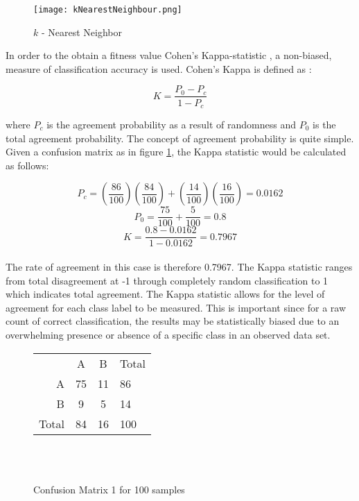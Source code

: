 \documentclass[journal,comsoc]{IEEEtran}
\begin{document}
\begin{figure}[H]
\centering
\texttt{[image: kNearestNeighbour.png]}
\caption{$k$ - Nearest Neighbor}
\end{figure}

In order to the obtain a fitness value Cohen's Kappa-statistic , a non-biased, measure of classification accuracy is used. Cohen's Kappa is defined as \cite{ben2008comparison}:

\begin{equation}
	K = \frac{P_0 - P_c}{1 - P_c}
\end{equation}

where $P_c$ is the agreement probability as a result of randomness and $P_0$ is the total agreement probability. The concept of agreement probability is quite simple. Given a confusion matrix as in figure \ref{fig:confuse}, the Kappa statistic would be calculated as follows:


$$
P_c = (\frac{86}{100})(\frac{84}{100}) + (\frac{14}{100})(\frac{16}{100}) = 0.0162
$$
$$
P_0 = \frac{75}{100} + \frac{5}{100} = 0.8
$$
\begin{equation}
K = \frac{0.8 - 0.0162}{1 - 0.0162} = 0.7967
\end{equation}
\hfill\\

The rate of agreement in this case is therefore 0.7967. The Kappa statistic ranges from total disagreement at -1 through completely random classification to 1 which indicates total agreement. The Kappa statistic allows for the level of agreement for each class label to be measured. This is important since for a raw count of correct classification, the results may be statistically biased due to an overwhelming presence or absence of a specific class in an observed data set.

\begin{figure}[H]
\centering
\begin{tabular}{ r|c|c|l }
\multicolumn{1}{r}{}
 &  \multicolumn{1}{c}{A}
 & \multicolumn{1}{c}{B}
& \multicolumn{1}{l}{Total} \\
\cline{2-3}
A & 75 & 11 & 86 \\
\cline{2-3}
B & 9 & 5 & 14 \\
\cline{2-3}
\multicolumn{1}{r}{Total}
 &  \multicolumn{1}{c}{84}
 & \multicolumn{1}{c}{16}
& \multicolumn{1}{l}{100}

\end{tabular}
\hfill\\\hfill\\
\caption{Confusion Matrix 1 for 100 samples}
\label{fig:confuse}
\end{figure}
\end{document}

